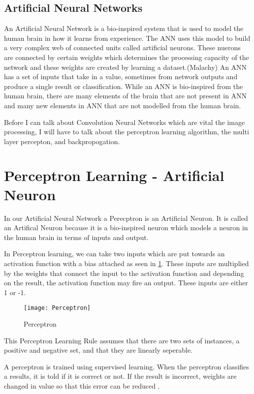 \subsection{Artificial Neural Networks}
An Artificial Neural Network is a bio-inspired system that is used to model the human brain in how it learns from experience.
The ANN uses this model to build a very complex web of connected units called
artificial neurons.
These nuerons are connected by certain weights which determines the processing
capacity of the network and these weights are created by learning a
dataset.(Malachy)
An ANN has a set of inputs that take in a value, sometimes from network outputs
and produce a single result or classification.
While an ANN is bio-inspired from the human brain, there are many elements of
the brain that are not present in ANN and many new elements in ANN that are not
modelled from the human brain.

Before I can talk about Convolution Neural Networks which are vital the image
processing, I will have to talk about the perceptron learning algorithm, the multi
layer percepton, and backpropogation.

\section{Perceptron Learning - Artificial Neuron}
In our Artificial Neural Network a Perecptron is an Artificial Neuron.
It is called an Artifical Neuron because it is a bio-inspired neuron which models
a neuron in the human brain in terms of inputs and output.

In Perceptron learning, we can take two inputs which are put towards an
activation function with a bias attached as seen in \ref{fig:perceptron}.
These inputs are multiplied by the weights that connect the input to the
activation function and depending on the result, the activation function may
fire an output. These inputs are either 1 or -1.

\begin{figure}
     \texttt{[image: Perceptron]}
     \caption{Perceptron}
     \label{fig:perceptron}
\end{figure}

This Perceptron Learning Rule assumes that there are two sets of instances, a
positive and negative set, and that they are linearly seperable.

A perceptron is trained using supervised learning. When the perceptron
classifies a results, it is told if it is correct or not. If the result is
incorrect, weights are changed in value so that this error can be reduced
\textcite{AI}. 

